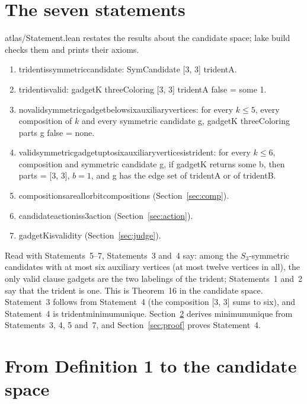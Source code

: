 \documentclass[11pt,a4paper]{article}
\newcommand{\leanus}{\textunderscore\allowbreak}
\newcommand{\lean}[1]{{\ttfamily\let\_\leanus #1}}
\theoremstyle{definition}
\begin{document}
\section{The seven statements}\label{sec:statements}

\lean{atlas/Statement.lean} restates the results about the candidate space;
\lean{lake build} checks them and prints their axioms.
\begin{enumerate}
\item \lean{trident\_is\_symmetric\_candidate}: \lean{SymCandidate [3, 3] tridentA}.
\item \lean{trident\_is\_valid}: \lean{gadgetK threeColoring [3, 3] tridentA false = some 1}.
\item \lean{no\_valid\_symmetric\_gadget\_below\_six\_auxiliary\_vertices}: for every
$k\le5$, every composition of $k$ and every symmetric candidate \lean{g},
\lean{gadgetK threeColoring parts g false = none}.
\item \lean{valid\_symmetric\_gadget\_up\_to\_six\_auxiliary\_vertices\_is\_trident}: for
every $k\le6$, composition and symmetric candidate \lean{g}, if
\lean{gadgetK} returns \lean{some b}, then \lean{parts = [3, 3]}, $b=1$, and
\lean{g} has the edge set of \lean{tridentA} or of \lean{tridentB}.
\item \lean{compositions\_are\_all\_orbit\_compositions} (Section~\ref{sec:comp}).
\item \lean{candidate\_action\_is\_s3\_action} (Section~\ref{sec:action}).
\item \lean{gadgetK\_is\_validity} (Section~\ref{sec:judge}).
\end{enumerate}
Read with Statements~5--7, Statements~3 and~4 say: among the $S_3$-symmetric
candidates with at most six auxiliary vertices (at most twelve vertices in
all), the only valid clause gadgets are the two labelings of the trident;
Statements~1 and~2 say that the trident is one. This is Theorem~16 in the
candidate space. Statement~3 follows from Statement~4 (the composition
\lean{[3, 3]} sums to six), and Statement~4 is \lean{trident\_minimum\_unique}.
Section~\ref{sec:def1} derives \lean{minimum\_unique} from Statements~3, 4, 5
and~7, and Section~\ref{sec:proof} proves Statement~4.

\section{From Definition 1 to the candidate space}\label{sec:def1}
\end{document}
